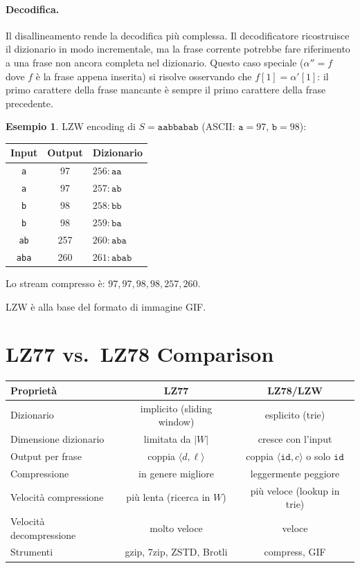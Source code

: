 \documentclass[12pt, a4paper, oneside]{book}
\theoremstyle{plain}
\theoremstyle{definition}
\newtheorem{esempio}[teorema]{Esempio}
\theoremstyle{remark}
\begin{document}
\paragraph{Decodifica.}
Il disallineamento rende la decodifica più complessa. Il decodificatore ricostruisce il dizionario in modo incrementale, ma la frase corrente potrebbe fare riferimento a una frase non ancora completa nel dizionario. Questo caso speciale ($\alpha'' = f$ dove $f$ è la frase appena inserita) si risolve osservando che $f[1] = \alpha'[1]$: il primo carattere della frase mancante è sempre il primo carattere della frase precedente.

\begin{esempio}
LZW encoding di $S = \texttt{aabbabab}$ (ASCII: $\texttt{a} = 97$, $\texttt{b} = 98$):

\medskip
\begin{tabular}{ccl}
Input & Output & Dizionario \\
\hline
\texttt{a} & 97 & $256: \texttt{aa}$ \\
\texttt{a} & 97 & $257: \texttt{ab}$ \\
\texttt{b} & 98 & $258: \texttt{bb}$ \\
\texttt{b} & 98 & $259: \texttt{ba}$ \\
\texttt{ab} & 257 & $260: \texttt{aba}$ \\
\texttt{aba} & 260 & $261: \texttt{abab}$ \\
\end{tabular}

Lo stream compresso è: $97, 97, 98, 98, 257, 260$.
\end{esempio}

LZW è alla base del formato di immagine GIF.

\section{LZ77 vs.\ LZ78 Comparison}
\label{sec:lz-comparison}

\begin{center}
\begin{tabular}{lcc}
\hline
\textbf{Proprietà} & \textbf{LZ77} & \textbf{LZ78/LZW} \\
\hline
Dizionario & implicito (sliding window) & esplicito (trie) \\
Dimensione dizionario & limitata da $|W|$ & cresce con l'input \\
Output per frase & coppia $\langle d, \ell \rangle$ & coppia $\langle \mathtt{id}, c \rangle$ o solo $\mathtt{id}$ \\
Compressione & in genere migliore & leggermente peggiore \\
Velocità compressione & più lenta (ricerca in $W$) & più veloce (lookup in trie) \\
Velocità decompressione & molto veloce & veloce \\
Strumenti & gzip, 7zip, ZSTD, Brotli & compress, GIF \\
\hline
\end{tabular}
\end{center}
\end{document}
